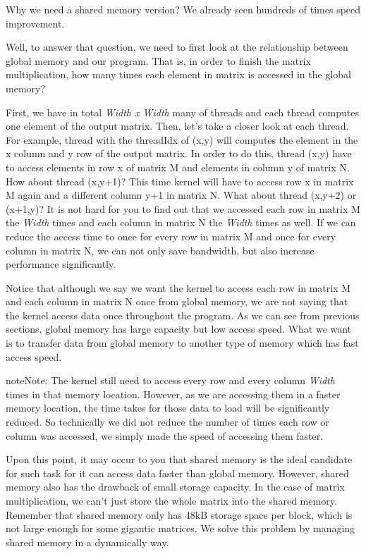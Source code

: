 \documentclass[letterpaper,10pt,openany,oneside]{sphinxmanual}
\begin{document}
Why we need a shared memory version? We already seen hundreds of times speed improvement.

Well, to answer that question, we need to first look at the relationship between global memory and our program. That is, in order to finish the matrix multiplication, how many times each element in matrix is accessed in the global memory?

First, we have in total \emph{Width x Width} many of threads and each thread computes one element of the output matrix. Then, let's take a closer look at each thread. For example, thread with the threadIdx of (x,y) will computes the element in the x column and y row of the output matrix. In order to do this, thread (x,y) have to access elements in row x of matrix M and elements in column y of matrix N. How about thread (x,y+1)? This time kernel will have to access row x in matrix M again and a different column y+1 in matrix N. What about thread (x,y+2) or (x+1,y)? It is not hard for you to find out that we accessed each row in matrix M the \emph{Width} times and each column in matrix N the \emph{Width} times as well. If we can reduce the access time to once for every row in matrix M and once for every column in matrix N, we can not only save bandwidth, but also increase performance significantly.

Notice that although we say we want the kernel to access each row in matrix M and each column in matrix N once from global memory, we are not saying that the kernel access data once throughout the program. As we can see from previous sections, global memory has large capacity but low access speed. What we want is to transfer data from global memory to another type of memory which has fast access speed.

\begin{notice}{note}{Note:}
The kernel still need to access every row and every column \emph{Width} times in that memory location. However, as we are accessing them in a faster memory location, the time takes for those data to load will be significantly reduced. So technically we did not reduce the number of times each row or column was accessed, we simply made the speed of accessing them faster.
\end{notice}

Upon this point, it may occur to you that shared memory is the ideal candidate for such task for it can access data faster than global memory. However, shared memory also has the drawback of small storage capacity. In the case of matrix multiplication, we can't just store the whole matrix into the shared memory. Remember that shared memory only has 48kB storage space per block, which is not large enough for some gigantic matrices. We solve this problem by managing shared memory in a dynamically way.
\end{document}
